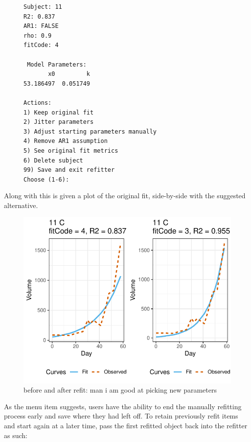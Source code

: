 \documentclass{article}
\begin{document}
\begin{singlespace}
\begin{figure}[H]
\centering
\begin{BVerbatim}
Subject: 11
R2: 0.837
AR1: FALSE
rho: 0.9
fitCode: 4

 Model Parameters:
       x0         k 
53.186497  0.051749 

Actions:
1) Keep original fit
2) Jitter parameters
3) Adjust starting parameters manually
4) Remove AR1 assumption
5) See original fit metrics
6) Delete subject
99) Save and exit refitter
Choose (1-6):
\end{BVerbatim}
\end{figure}
\end{singlespace}



Along with this is given a plot of the original fit, side-by-side with the suggested alternative. 

\begin{figure}[H]
\centering
\includegraphics{img/mouse_refit_plot.pdf}
\caption{before and after refit: man i am good at picking new parameters}
\end{figure}

As the menu item suggests, users have the ability to end the manually refitting process early and save where they had left off. To retain previously refit items and start again at a later time, pass the first refitted object back into the refitter as such:
\end{document}
